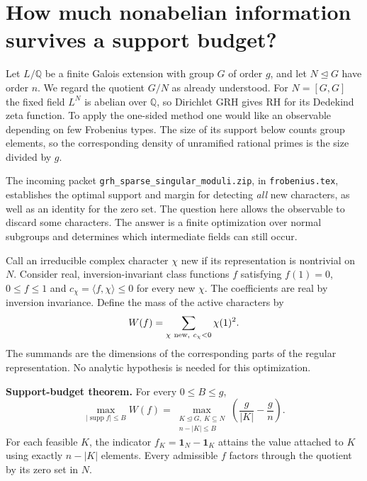 \section{How much nonabelian information survives a support budget?}

Let $L/\mathbb Q$ be a finite Galois extension with group $G$ of order $g$, and let $N\trianglelefteq G$ have order $n$. We regard the quotient $G/N$ as already understood. For $N=[G,G]$ the fixed field $L^N$ is abelian over $\mathbb Q$, so Dirichlet GRH gives RH for its Dedekind zeta function. To apply the one-sided method one would like an observable depending on few Frobenius types. The size of its support below counts group elements, so the corresponding density of unramified rational primes is the size divided by $g$.

The incoming packet \texttt{grh\_sparse\_singular\_moduli.zip}, in \texttt{frobenius.tex}, establishes the optimal support and margin for detecting \emph{all} new characters, as well as an identity for the zero set. The question here allows the observable to discard some characters. The answer is a finite optimization over normal subgroups and determines which intermediate fields can still occur.

Call an irreducible complex character $\chi$ new if its representation is nontrivial on $N$. Consider real, inversion-invariant class functions $f$ satisfying $f(1)=0$, $0\le f\le1$ and $c_\chi=\langle f,\chi\rangle\le0$ for every new $\chi$. The coefficients are real by inversion invariance. Define the mass of the active characters by
\[
 W(f)=\sum_{\chi\ {\rm new},\ c_\chi<0}\chi(1)^2.
\]
The summands are the dimensions of the corresponding parts of the regular representation. No analytic hypothesis is needed for this optimization.

\medskip\noindent\textbf{Support-budget theorem.}
For every $0\le B\le g$,
\[
 \max_{|\operatorname{supp} f|\le B}W(f)
 =\max_{\substack{K\trianglelefteq G,\ K\subseteq N\\ n-|K|\le B}}
      \left(\frac{g}{|K|}-\frac{g}{n}\right).
\]
For each feasible $K$, the indicator $f_K=\mathbf1_N-\mathbf1_K$ attains the value attached to $K$ using exactly $n-|K|$ elements. Every admissible $f$ factors through the quotient by its zero set in $N$.

